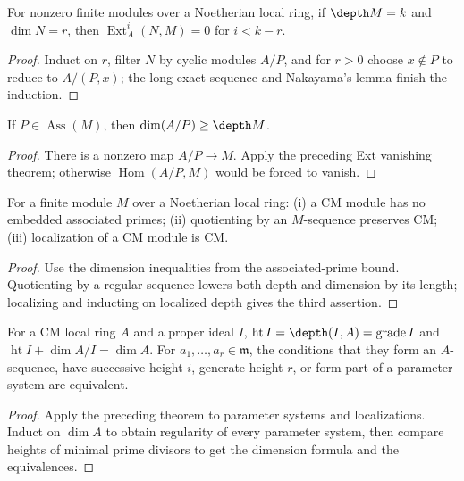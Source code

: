 \begin{theorem}[Ischebeck]\label{mcrt-thm-17-1}
For nonzero finite modules over a Noetherian local ring, if $\depth M=k$ and
$\dim N=r$, then $\operatorname{Ext}^i_A(N,M)=0$ for $i<k-r$.
\end{theorem}
\begin{proof}
Induct on $r$, filter $N$ by cyclic modules $A/P$, and for $r>0$ choose
$x\notin P$ to reduce to $A/(P,x)$; the long exact sequence and Nakayama's
lemma finish the induction.
\end{proof}

\begin{theorem}\label{mcrt-thm-17-2}
If $P\in\operatorname{Ass}(M)$, then $\dim(A/P)\ge\depth M$.
\end{theorem}
\begin{proof}
There is a nonzero map $A/P\to M$.  Apply the preceding Ext vanishing theorem;
otherwise $\operatorname{Hom}(A/P,M)$ would be forced to vanish.
\end{proof}

\begin{theorem}\label{mcrt-thm-17-3}
For a finite module $M$ over a Noetherian local ring: (i) a CM module has no
embedded associated primes; (ii) quotienting by an $M$-sequence preserves CM;
(iii) localization of a CM module is CM.
\end{theorem}
\begin{proof}
Use the dimension inequalities from the associated-prime bound.  Quotienting
by a regular sequence lowers both depth and dimension by its length; localizing
and inducting on localized depth gives the third assertion.
\end{proof}

\begin{theorem}\label{mcrt-thm-17-4}
For a CM local ring $A$ and a proper ideal $I$,
$\operatorname{ht}I=\depth(I,A)=\operatorname{grade}I$ and
$\operatorname{ht}I+\dim A/I=\dim A$.  For $a_1,\ldots,a_r\in\mathfrak m$,
the conditions that they form an $A$-sequence, have successive height $i$,
generate height $r$, or form part of a parameter system are equivalent.
\end{theorem}
\begin{proof}
Apply the preceding theorem to parameter systems and localizations.  Induct on
$\dim A$ to obtain regularity of every parameter system, then compare heights
of minimal prime divisors to get the dimension formula and the equivalences.
\end{proof}

